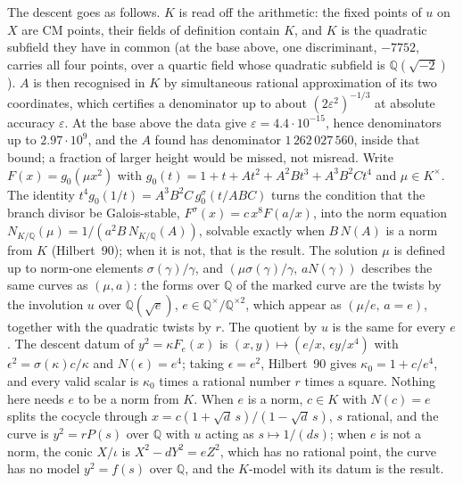 \documentclass[11pt,reqno]{amsart}
\theoremstyle{plain}
\theoremstyle{definition}
\newcommand{\Q}{\mathbb{Q}}
\begin{document}
The descent goes as follows. $K$ is read off the arithmetic: the fixed points of $u$ on $X$ are
CM points, their fields of definition contain $K$, and $K$ is the quadratic subfield they have in
common (at the base above, one discriminant, $-7752$, carries all four points, over a quartic
field whose quadratic subfield is $\Q(\sqrt{-2})$). $A$ is then recognised in $K$ by simultaneous
rational approximation of its two coordinates, which certifies a denominator up to about
$(2\varepsilon^2)^{-1/3}$ at absolute accuracy $\varepsilon$. At the base above the data give
$\varepsilon=4.4\cdot10^{-15}$, hence denominators up to $2.97\cdot10^9$, and the $A$ found has
denominator $1\,262\,027\,560$, inside that bound; a fraction of larger height would be missed,
not misread. Write $F(x)=g_0(\mu x^2)$ with
$g_0(t)=1+t+At^2+A^2Bt^3+A^3B^2Ct^4$ and $\mu\in K^\times$. The identity
$t^4g_0(1/t)=A^3B^2C\,g_0^\sigma(t/ABC)$ turns the condition that the branch divisor be
Galois-stable, $F^\sigma(x)=c\,x^8F(a/x)$, into the norm equation
$N_{K/\Q}(\mu)=1/(a^2B\,N_{K/\Q}(A))$, solvable exactly when $B\,N(A)$ is a norm from $K$
(Hilbert~90); when it is not, that is the result. The solution $\mu$ is defined up to norm-one
elements $\sigma(\gamma)/\gamma$, and $(\mu\sigma(\gamma)/\gamma,\,aN(\gamma))$ describes the
same curves as $(\mu,a)$: the forms over $\Q$ of the marked curve are the twists by the involution
$u$ over $\Q(\sqrt e)$, $e\in\Q^\times/\Q^{\times2}$, which appear as $(\mu/e,\,a=e)$, together
with the quadratic twists by $r$. The quotient by $u$ is the same for every $e$. The descent
datum of $y^2=\kappa F_e(x)$ is $(x,y)\mapsto(e/x,\,\epsilon y/x^4)$ with
$\epsilon^2=\sigma(\kappa)c/\kappa$ and $N(\epsilon)=e^4$; taking $\epsilon=e^2$, Hilbert~90 gives
$\kappa_0=1+c/e^4$, and every valid scalar is $\kappa_0$ times a rational number $r$ times a
square. Nothing here needs $e$ to be a norm from $K$. When $e$ is a norm, $c\in K$ with $N(c)=e$
splits the cocycle through $x=c(1+\sqrt d\,s)/(1-\sqrt d\,s)$, $s$ rational, and the curve is
$y^2=rP(s)$ over $\Q$ with $u$ acting as $s\mapsto 1/(ds)$; when $e$ is not a norm, the conic
$X/\iota$ is $X^2-dY^2=eZ^2$, which has no rational point, the curve has no model $y^2=f(s)$ over
$\Q$, and the $K$-model with its datum is the result.
\end{document}
